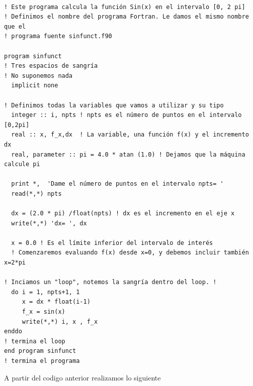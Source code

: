 \documentclass[12pt,a4paper,openright]{article}
\begin{document}
\begin{verbatim}

! Este programa calcula la función Sin(x) en el intervalo [0, 2 pi]
! Definimos el nombre del programa Fortran. Le damos el mismo nombre que el 
! programa fuente sinfunct.f90
 
program sinfunct
! Tres espacios de sangría
! No suponemos nada
  implicit none
 
! Definimos todas la variables que vamos a utilizar y su tipo
  integer :: i, npts ! npts es el número de puntos en el intervalo [0,2pi]
  real :: x, f_x,dx  ! La variable, una función f(x) y el incremento dx
  real, parameter :: pi = 4.0 * atan (1.0) ! Dejamos que la máquina calcule pi
 
  print *,  'Dame el número de puntos en el intervalo npts= '
  read(*,*) npts
 
  dx = (2.0 * pi) /float(npts) ! dx es el incremento en el eje x
  write(*,*) 'dx= ', dx
 
  x = 0.0 ! Es el límite inferior del intervalo de interés
  ! Comenzaremos evaluando f(x) desde x=0, y debemos incluir también x=2*pi
 
! Inciamos un "loop", notemos la sangría dentro del loop. !
  do i = 1, npts+1, 1 
     x = dx * float(i-1)
     f_x = sin(x)
     write(*,*) i, x , f_x
enddo
! termina el loop
end program sinfunct 
! termina el programa

\end{verbatim}

\begin{large}
A partir del codigo anterior realizamos lo siguiente 
\end{large}
\end{document}

